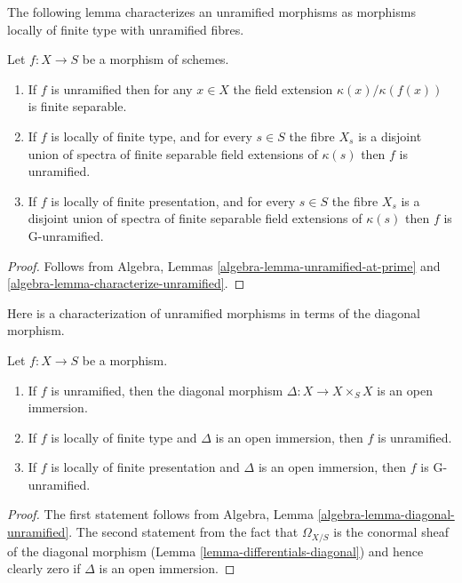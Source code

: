 \noindent
The following lemma characterizes an unramified morphisms as
morphisms locally of finite type with unramified fibres.

\begin{lemma}
\label{lemma-unramified-etale-fibres}
Let $f : X \to S$ be a morphism of schemes.
\begin{enumerate}
\item If $f$ is unramified then for any $x \in X$ the field extension
$\kappa(x)/\kappa(f(x))$ is finite separable.
\item If $f$ is locally of finite type, and for every
$s \in S$ the fibre $X_s$ is a disjoint union of spectra of finite separable
field extensions of $\kappa(s)$ then $f$ is unramified.
\item If $f$ is locally of finite presentation, and for every
$s \in S$ the fibre $X_s$ is a disjoint union of spectra of finite separable
field extensions of $\kappa(s)$ then $f$ is G-unramified.
\end{enumerate}
\end{lemma}

\begin{proof}
Follows from Algebra, Lemmas
\ref{algebra-lemma-unramified-at-prime} and
\ref{algebra-lemma-characterize-unramified}.
\end{proof}

\noindent
Here is a characterization of unramified morphisms in terms of the
diagonal morphism.

\begin{lemma}
\label{lemma-diagonal-unramified-morphism}
Let $f : X \to S$ be a morphism.
\begin{enumerate}
\item If $f$ is unramified, then the diagonal morphism
$\Delta : X \to X \times_S X$ is an open immersion.
\item If $f$ is locally of finite type
and $\Delta$ is an open immersion, then $f$ is unramified.
\item If $f$ is locally of finite presentation and $\Delta$ is an open
immersion, then $f$ is G-unramified.
\end{enumerate}
\end{lemma}

\begin{proof}
The first statement follows from
Algebra, Lemma \ref{algebra-lemma-diagonal-unramified}.
The second statement from the fact that $\Omega_{X/S}$
is the conormal sheaf of the diagonal morphism
(Lemma \ref{lemma-differentials-diagonal})
and hence clearly zero if $\Delta$ is an open immersion.
\end{proof}

